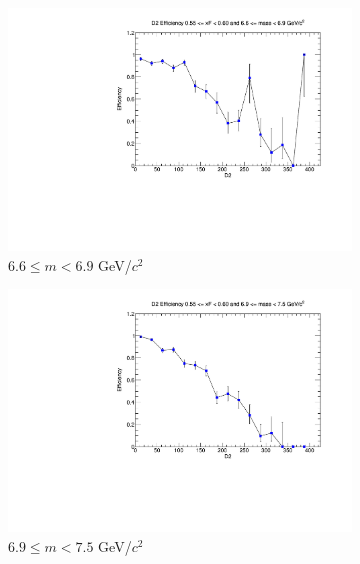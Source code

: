 \begin{figure}[p]
\begin{subfigure}[b]{0.32\textwidth}
        \includegraphics[width=\textwidth]{./kTrackerEfficiencyPlots/D2_Efficiency_xF11_mass8.pdf}
        \caption{$6.6 \leq m < 6.9$ GeV/$c^2$}
        \label{fig:xF11_mass8}
    \end{subfigure}
    \vspace{0.5cm}
    \begin{subfigure}[b]{0.32\textwidth}
        \centering
        \includegraphics[width=\textwidth]{./kTrackerEfficiencyPlots/D2_Efficiency_xF11_mass9.pdf}
        \caption{$6.9 \leq m < 7.5$ GeV/$c^2$}
        \label{fig:xF11_mass9}
    \end{subfigure}
    \hfill
    \begin{subfigure}[b]{0.32\textwidth}
        \centering

\end{subfigure}
\end{figure}
